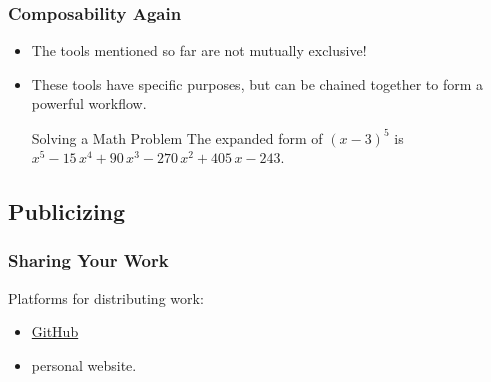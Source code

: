 \documentclass{beamer}
\begin{document}
\begin{frame}[<+->]
	\frametitle{Composability Again}
	\begin{itemize}
		\item The tools mentioned so far are not mutually exclusive!

		      \vfill

		\item These tools have specific purposes, but can be chained together to form a powerful workflow.

		      \vfill

		      \begin{exampleblock}{Solving a Math Problem}
			      The expanded form of \( {(x-3)}^5 \) is \( x^{5} - 15 \, x^{4} + 90 \, x^{3} - 270 \, x^{2} + 405 \, x - 243 \).
		      \end{exampleblock}

		      \vfill
	\end{itemize}
\end{frame}

\subsection{Publicizing}

\begin{frame}[<+->]
	\frametitle{Sharing Your Work}
	Platforms for distributing work:
	\begin{itemize}
		\item \textcolor{wvwccomp}{\href{https://www.github.com}{GitHub}}

		      \vfill

		\item personal website.

		      \vfill
	\end{itemize}


	\vfill
\end{frame}
\end{document}
